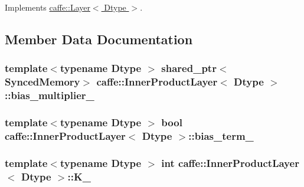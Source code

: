Implements \hyperlink{classcaffe_1_1_layer_abd13c6489c13953b4fbcfcf6880835d0}{caffe\+::\+Layer$<$ Dtype $>$}.



\subsection{Member Data Documentation}
\hypertarget{classcaffe_1_1_inner_product_layer_a2d7ebfa9183f4e4bdf9546965c3cc0a8}{
\subsubsection[{bias\+\_\+multiplier\+\_\+}]{\setlength{\rightskip}{0pt plus 5cm}template$<$typename Dtype $>$ shared\+\_\+ptr$<${\bf Synced\+Memory}$>$ {\bf caffe\+::\+Inner\+Product\+Layer}$<$ Dtype $>$\+::bias\+\_\+multiplier\+\_\+\hspace{0.3cm}{\ttfamily [protected]}}}\label{classcaffe_1_1_inner_product_layer_a2d7ebfa9183f4e4bdf9546965c3cc0a8}
\hypertarget{classcaffe_1_1_inner_product_layer_a7193d161e30f35b3f6d23293480eb683}{
\subsubsection[{bias\+\_\+term\+\_\+}]{\setlength{\rightskip}{0pt plus 5cm}template$<$typename Dtype $>$ bool {\bf caffe\+::\+Inner\+Product\+Layer}$<$ Dtype $>$\+::bias\+\_\+term\+\_\+\hspace{0.3cm}{\ttfamily [protected]}}}\label{classcaffe_1_1_inner_product_layer_a7193d161e30f35b3f6d23293480eb683}
\hypertarget{classcaffe_1_1_inner_product_layer_ad5a55ef3cb96a332977930cfaa700c66}{
\subsubsection[{K\+\_\+}]{\setlength{\rightskip}{0pt plus 5cm}template$<$typename Dtype $>$ int {\bf caffe\+::\+Inner\+Product\+Layer}$<$ Dtype $>$\+::K\+\_\+\hspace{0.3cm}{\ttfamily [protected]}}}\label{classcaffe_1_1_inner_product_layer_ad5a55ef3cb96a332977930cfaa700c66}
